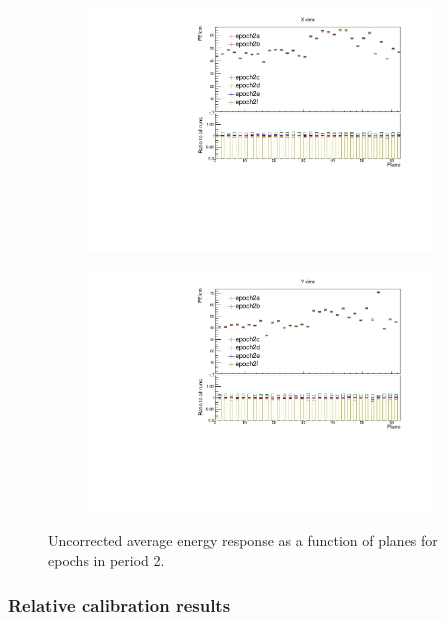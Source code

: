 \documentclass[12pt,a4paper]{article}
\begin{document}
\begin{figure}[!hbtp]
\centering
\begin{subfigure}[b]{0.495\textwidth}
\centering
\includegraphics[width=\textwidth]{Plots/Attenprofs_P2Data_PlanePE_X_Combined.pdf}
\end{subfigure}
\begin{subfigure}[b]{0.495\textwidth}
\centering
\includegraphics[width=\textwidth]{Plots/Attenprofs_P2Data_PlanePE_Y_Combined.pdf}
\end{subfigure}
\caption{Uncorrected average energy response as a function of planes for epochs in period 2.}
\label{figCalibhistPlanePE_period2}
\end{figure}

\subsubsection{Relative calibration results}
\end{document}
